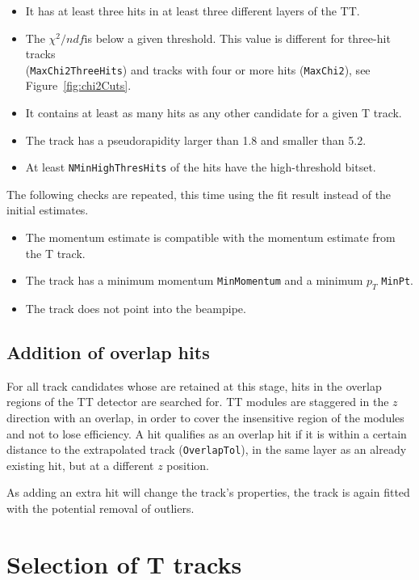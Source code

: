 \begin{itemize}
\item It has at least three hits in at least three different layers of the TT.
\item The $\chi^{2}/ndf$is below a given threshold. This value is different for
three-hit tracks \\ (\texttt{MaxChi2ThreeHits}) and tracks with four or more hits (\texttt{MaxChi2}),
see Figure~\ref{fig:chi2Cuts}. 
\item It contains at least as many hits as any other candidate for a given T track.
\item The track has a pseudorapidity larger than 1.8 and smaller than 5.2.
\item At least \texttt{NMinHighThresHits} of the hits have the high-threshold
bitset.
\end{itemize}

The following checks are repeated, this time using the fit result instead of the initial estimates.

\begin{itemize}
\item The momentum estimate is compatible with the momentum estimate from the
T track.
\item The track has a minimum momentum \texttt{MinMomentum} and a minimum $p_{T}$ \texttt{MinPt}.
\item The track does not point into the beampipe.
\end{itemize}

\subsection{Addition of overlap hits}
\label{sec:addOverlap}
For all track candidates whose are retained at this stage, hits in the overlap
regions of the TT detector are searched for. 
TT modules are staggered in the $z$ direction with an overlap, in order to cover the insensitive region of the modules and not to lose efficiency. A hit qualifies as an overlap hit if it
is within a certain distance to the extrapolated track (\texttt{OverlapTol}), in the same
layer as an already existing hit, but at a
different $z$ position.

As adding an extra hit will change the track's properties, the track
is again fitted with the potential removal of outliers. 


\section{Selection of T tracks }
\label{sec:TSeed}

